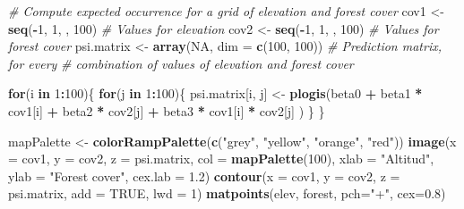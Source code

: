 \documentclass[
]{book}
\newenvironment{Shaded}{\begin{snugshade}}{\end{snugshade}}
\newcommand{\CommentTok}[1]{\textcolor[rgb]{0.56,0.35,0.01}{\textit{#1}}}
\newcommand{\ControlFlowTok}[1]{\textcolor[rgb]{0.13,0.29,0.53}{\textbf{#1}}}
\newcommand{\DataTypeTok}[1]{\textcolor[rgb]{0.13,0.29,0.53}{#1}}
\newcommand{\DecValTok}[1]{\textcolor[rgb]{0.00,0.00,0.81}{#1}}
\newcommand{\FloatTok}[1]{\textcolor[rgb]{0.00,0.00,0.81}{#1}}
\newcommand{\KeywordTok}[1]{\textcolor[rgb]{0.13,0.29,0.53}{\textbf{#1}}}
\newcommand{\NormalTok}[1]{#1}
\newcommand{\OperatorTok}[1]{\textcolor[rgb]{0.81,0.36,0.00}{\textbf{#1}}}
\newcommand{\OtherTok}[1]{\textcolor[rgb]{0.56,0.35,0.01}{#1}}
\newcommand{\StringTok}[1]{\textcolor[rgb]{0.31,0.60,0.02}{#1}}
\begin{document}
\begin{Shaded}
\begin{Highlighting}[]
\CommentTok{# Compute expected occurrence for a grid of elevation and forest cover}
\NormalTok{cov1 <-}\StringTok{ }\KeywordTok{seq}\NormalTok{(}\OperatorTok{-}\DecValTok{1}\NormalTok{, }\DecValTok{1}\NormalTok{, , }\DecValTok{100}\NormalTok{)                       }\CommentTok{# Values for elevation}
\NormalTok{cov2 <-}\StringTok{ }\KeywordTok{seq}\NormalTok{(}\OperatorTok{-}\DecValTok{1}\NormalTok{, }\DecValTok{1}\NormalTok{, , }\DecValTok{100}\NormalTok{)                       }\CommentTok{# Values for forest cover}
\NormalTok{psi.matrix <-}\StringTok{ }\KeywordTok{array}\NormalTok{(}\OtherTok{NA}\NormalTok{, }\DataTypeTok{dim =} \KeywordTok{c}\NormalTok{(}\DecValTok{100}\NormalTok{, }\DecValTok{100}\NormalTok{))      }\CommentTok{# Prediction matrix, for every }
\CommentTok{# combination of values of elevation and forest cover}

\ControlFlowTok{for}\NormalTok{(i }\ControlFlowTok{in} \DecValTok{1}\OperatorTok{:}\DecValTok{100}\NormalTok{)\{}
   \ControlFlowTok{for}\NormalTok{(j }\ControlFlowTok{in} \DecValTok{1}\OperatorTok{:}\DecValTok{100}\NormalTok{)\{}
\NormalTok{      psi.matrix[i, j] <-}\StringTok{ }\KeywordTok{plogis}\NormalTok{(beta0 }\OperatorTok{+}\StringTok{ }
\StringTok{                                   }\NormalTok{beta1 }\OperatorTok{*}\StringTok{ }\NormalTok{cov1[i] }\OperatorTok{+}\StringTok{ }
\StringTok{                                   }\NormalTok{beta2 }\OperatorTok{*}\StringTok{ }\NormalTok{cov2[j] }\OperatorTok{+}\StringTok{ }
\StringTok{                                   }\NormalTok{beta3 }\OperatorTok{*}\StringTok{ }\NormalTok{cov1[i] }\OperatorTok{*}\StringTok{ }\NormalTok{cov2[j] )}
\NormalTok{   \}}
\NormalTok{\}}

\NormalTok{mapPalette <-}\StringTok{ }\KeywordTok{colorRampPalette}\NormalTok{(}\KeywordTok{c}\NormalTok{(}\StringTok{"grey"}\NormalTok{, }\StringTok{"yellow"}\NormalTok{, }\StringTok{"orange"}\NormalTok{, }\StringTok{"red"}\NormalTok{))}
\KeywordTok{image}\NormalTok{(}\DataTypeTok{x =}\NormalTok{ cov1, }\DataTypeTok{y =}\NormalTok{ cov2, }\DataTypeTok{z =}\NormalTok{ psi.matrix, }\DataTypeTok{col =} \KeywordTok{mapPalette}\NormalTok{(}\DecValTok{100}\NormalTok{), }\DataTypeTok{xlab =} \StringTok{"Altitud"}\NormalTok{, }
      \DataTypeTok{ylab =} \StringTok{"Forest cover"}\NormalTok{, }\DataTypeTok{cex.lab =} \FloatTok{1.2}\NormalTok{)}
\KeywordTok{contour}\NormalTok{(}\DataTypeTok{x =}\NormalTok{ cov1, }\DataTypeTok{y =}\NormalTok{ cov2, }\DataTypeTok{z =}\NormalTok{ psi.matrix, }\DataTypeTok{add =} \OtherTok{TRUE}\NormalTok{, }\DataTypeTok{lwd =} \DecValTok{1}\NormalTok{)}
\KeywordTok{matpoints}\NormalTok{(elev, forest, }\DataTypeTok{pch=}\StringTok{"+"}\NormalTok{, }\DataTypeTok{cex=}\FloatTok{0.8}\NormalTok{)}
\end{Highlighting}
\end{Shaded}
\end{document}
